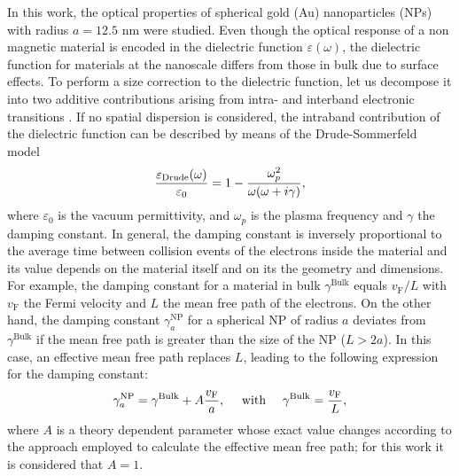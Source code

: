 
In this work, the optical properties of spherical gold (Au) nanoparticles (NPs) with radius $a = 12.5$ nm were studied. Even though the optical response of a non magnetic material is encoded in the dielectric function $\varepsilon(\omega)$, the dielectric function for materials at the nanoscale differs from those in bulk due to surface effects. To perform a size correction to the dielectric function, let us decompose it into two additive contributions arising from intra- and interband electronic transitions \cite{noguez_surface_2007}. If no spatial dispersion is considered, the intraband contribution of the dielectric function can be described by means of the Drude-Sommerfeld model
%
\begin{align}
\frac{\varepsilon_\text{\scriptsize Drude}(\omega)}{\varepsilon_0} = 1 - \frac{\omega_p^2}{\omega(\omega + i \gamma)},
\label{eq:Drude}
\end{align}
%
where $\varepsilon_0$ is the vacuum permittivity, and $\omega_p$ is the plasma frequency and $\gamma$ the damping constant. In general, the damping constant is inversely proportional to the average time between collision events of the electrons inside the material and its value depends on the material itself and on its the geometry and dimensions. For example, the damping constant for a material in bulk $\gamma^\text{Bulk}$ equals $v_\text{F}/L$  with $v_\text{F}$ the Fermi velocity and $L$ the  mean free path of the electrons. On the other hand, the damping constant $\gamma^\text{NP}_a$ for a spherical NP of radius $a$ deviates from $\gamma^\text{Bulk}$ if the mean free path is greater than the size of the NP ($ L > 2a $). In this case, an effective  mean free path replaces $L$, leading to the following expression for the damping constant:
%
\begin{align}
\gamma^\text{\scriptsize  NP}_a =  \gamma^\text{\scriptsize Bulk} + A\frac{v_\text{F}}{a},
\qqtext{ with }
\gamma^\text{\scriptsize  Bulk} = \frac{v_\text{F}}{L},
\label{eq:SC}
\end{align}
%
where $A$ is a theory dependent parameter whose exact value changes according to the approach employed to calculate the effective mean free path; for this work it is considered that $A = 1$.

